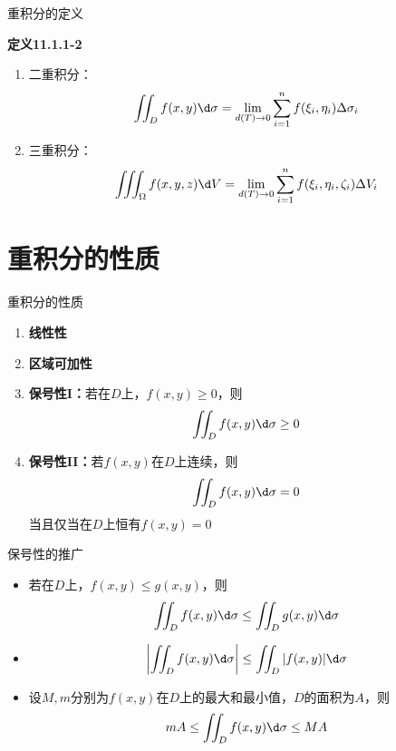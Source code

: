 \begin{frame}{重积分的定义}
	\linespread{1.2}\pause 
	\begin{block}{{\bf 定义11.1.1-2}\hfill}
		\begin{enumerate}
		  \item {\bb 二重积分：}\pause 
		  $$\iint_Df(x,y)\d\sigma=\lim_{d(T)\to
		  0}\sum_{i=1}^nf(\xi_i,\eta_i)\Delta\sigma_i$$\pause 
		  \item {\bb 三重积分：}\pause 
		  $$\iiint_{\Omega}f(x,y,z)\d V=\lim_{d(T)\to
		  0}\sum_{i=1}^nf(\xi_i,\eta_i,\zeta_i)\Delta V_i$$
		\end{enumerate}
	\end{block}
\end{frame}

\section{重积分的性质}

\begin{frame}{重积分的性质}
	\linespread{1.2}\pause 
	\begin{enumerate}
	  \item {\bf 线性性}\pause 
	  \item {\bf 区域可加性}\pause 
	  \item {\bf 保号性I：}\pause 若在$D$上，$f(x,y)\geq 0$，则
	  $$\iint_Df(x,y)\d\sigma\geq 0$$\pause 
	  \item {\bf 保号性II：}\pause 若$f(x,y)$在$D$上连续，则
	  $$\iint_Df(x,y)\d\sigma=0$$
	  当且仅当在$D$上恒有$f(x,y)=0$
	\end{enumerate}
\end{frame}

\begin{frame}{保号性的推广}
	\linespread{1.2}\pause 
	\begin{itemize}
	  \item 若在$D$上，$f(x,y)\leq g(x,y)$，则
	  $$\iint_Df(x,y)\d\sigma\leq\iint_Dg(x,y)\d\sigma$$\pause 
	  \vspace{-1em}
	  \item $$\left|\iint_Df(x,y)\d\sigma\right|\leq\iint_D|f(x,y)|\d\sigma$$\pause 
	  \item 设$M,m$分别为$f(x,y)$在$D$上的最大和最小值，$D$的面积为$A$，则
	  $$mA\leq\iint_Df(x,y)\d\sigma\leq MA$$
	\end{itemize}
\end{frame}

